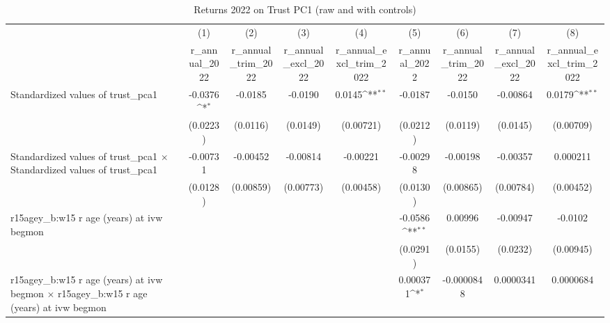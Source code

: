 \begin{table}[htbp]\centering
\def\sym#1{\ifmmode^{#1}\else\(^{#1}\)\fi}
\caption{Returns 2022 on Trust PC1 (raw and with controls)}
\begin{tabular}{l*{8}{c}}
\toprule
                &\multicolumn{1}{c}{(1)}&\multicolumn{1}{c}{(2)}&\multicolumn{1}{c}{(3)}&\multicolumn{1}{c}{(4)}&\multicolumn{1}{c}{(5)}&\multicolumn{1}{c}{(6)}&\multicolumn{1}{c}{(7)}&\multicolumn{1}{c}{(8)}\\
                &\multicolumn{1}{c}{r\_annual\_2022}&\multicolumn{1}{c}{r\_annual\_trim\_2022}&\multicolumn{1}{c}{r\_annual\_excl\_2022}&\multicolumn{1}{c}{r\_annual\_excl\_trim\_2022}&\multicolumn{1}{c}{r\_annual\_2022}&\multicolumn{1}{c}{r\_annual\_trim\_2022}&\multicolumn{1}{c}{r\_annual\_excl\_2022}&\multicolumn{1}{c}{r\_annual\_excl\_trim\_2022}\\
\midrule
Standardized values of trust\_pca1&  -0.0376\sym{*}  &  -0.0185         &  -0.0190         &   0.0145\sym{**} &  -0.0187         &  -0.0150         & -0.00864         &   0.0179\sym{**} \\
                & (0.0223)         & (0.0116)         & (0.0149)         &(0.00721)         & (0.0212)         & (0.0119)         & (0.0145)         &(0.00709)         \\
\addlinespace
Standardized values of trust\_pca1 $\times$ Standardized values of trust\_pca1& -0.00731         & -0.00452         & -0.00814         & -0.00221         & -0.00298         & -0.00198         & -0.00357         & 0.000211         \\
                & (0.0128)         &(0.00859)         &(0.00773)         &(0.00458)         & (0.0130)         &(0.00865)         &(0.00784)         &(0.00452)         \\
\addlinespace
r15agey\_b:w15 r age (years) at ivw begmon&                  &                  &                  &                  &  -0.0586\sym{**} &  0.00996         & -0.00947         &  -0.0102         \\
                &                  &                  &                  &                  & (0.0291)         & (0.0155)         & (0.0232)         &(0.00945)         \\
\addlinespace
r15agey\_b:w15 r age (years) at ivw begmon $\times$ r15agey\_b:w15 r age (years) at ivw begmon&                  &                  &                  &                  & 0.000371\sym{*}  &-0.0000848         &0.0000341         &0.0000684         \\

\end{tabular}
\end{table}
